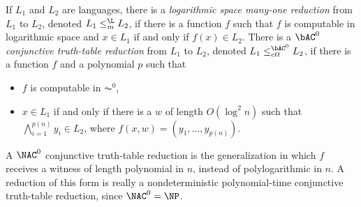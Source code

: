 If $L_1$ and $L_2$ are languages, there is a \emph{logarithmic space many-one reduction} from $L_1$ to $L_2$, denoted $L_1 \leq_m^{\L} L_2$, if there is a function $f$ such that $f$ is computable in logarithmic space and $x \in L_1$ if and only if $f(x) \in L_2$.
There is a \emph{$\bAC^0$ conjunctive truth-table reduction} from $L_1$ to $L_2$, denoted $L_1 \leq^{\bAC^0}_{ctt} L_2$, if there is a function $f$ and a polynomial $p$ such that
\begin{itemize}
\item $f$ is computable in $\AC^0$,
\item $x \in L_1$ if and only if there is a $w$ of length $O(\log^2 n)$ such that $\bigwedge_{i = 1}^{p(n)} y_i \in L_2$, where $f(x, w) = (y_1, \dotsc, y_{p(n)})$.
\end{itemize}
A $\NAC^0$ conjunctive truth-table reduction is the generalization in which $f$ receives a witness of length polynomial in $n$, instead of polylogarithmic in $n$.
A reduction of this form is really a nondeterministic polynomial-time conjunctive truth-table reduction, since $\NAC^0 = \NP$.

